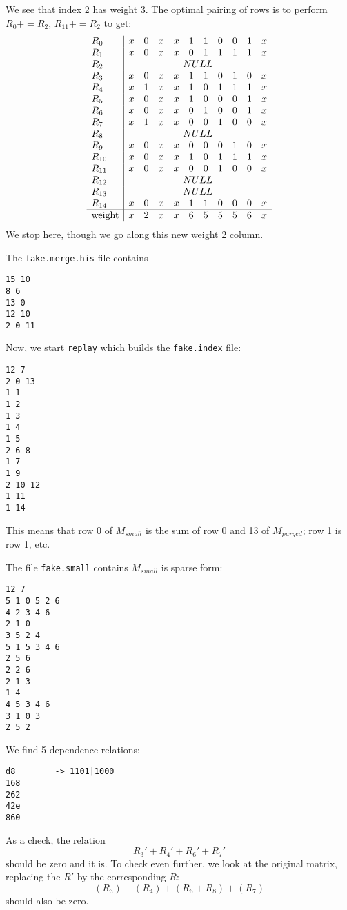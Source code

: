 \documentclass{article}
\begin{document}
We see that index 2 has weight 3. The optimal pairing of rows is to
perform $R_0 += R_2$, $R_{11} += R_2$ to get:
$$
\begin{array}{l|cccccccccc}
R_{0}& x& 0& x& x& 1& 1& 0& 0& 1& x\\
R_{1}& x& 0& x& x& 0& 1& 1& 1& 1& x\\
R_{2}& \multicolumn{10}{c}{NULL} \\
R_{3}& x& 0& x& x& 1& 1& 0& 1& 0& x\\
R_{4}& x& 1& x& x& 1& 0& 1& 1& 1& x\\
R_{5}& x& 0& x& x& 1& 0& 0& 0& 1& x\\
R_{6}& x& 0& x& x& 0& 1& 0& 0& 1& x\\
R_{7}& x& 1& x& x& 0& 0& 1& 0& 0& x\\
R_{8}& \multicolumn{10}{c}{NULL} \\
R_{9}& x& 0& x& x& 0& 0& 0& 1& 0& x\\
R_{10}& x& 0& x& x& 1& 0& 1& 1& 1& x\\
R_{11}& x& 0& x& x& 0& 0& 1& 0& 0& x\\
R_{12}& \multicolumn{10}{c}{NULL} \\
R_{13}& \multicolumn{10}{c}{NULL} \\
R_{14}& x& 0& x& x& 1& 1& 0& 0& 0& x\\
\hline
\text{weight}& x& 2& x& x& 6& 5& 5& 5& 6& x\\
\end{array}
$$
We stop here, though we go along this new weight 2 column.

The \verb+fake.merge.his+ file contains
\begin{verbatim}
15 10
8 6
13 0
12 10
2 0 11
\end{verbatim}

Now, we start \verb+replay+ which builds the \verb+fake.index+ file:
\begin{verbatim}
12 7
2 0 13
1 1
1 2
1 3
1 4
1 5
2 6 8
1 7
1 9
2 10 12
1 11
1 14
\end{verbatim}
This means that row 0 of $M_{small}$ is the sum of row 0 and 13 of
$M_{purged}$; row 1 is row 1, etc.

The file \verb+fake.small+ contains $M_{small}$ is sparse form:
\begin{verbatim}
12 7
5 1 0 5 2 6
4 2 3 4 6
2 1 0
3 5 2 4
5 1 5 3 4 6
2 5 6
2 2 6
2 1 3
1 4
4 5 3 4 6
3 1 0 3
2 5 2
\end{verbatim}
We find 5 dependence relations:
\begin{verbatim}
d8        -> 1101|1000
168
262
42e
860
\end{verbatim}
As a check, the relation
$$R_3'+R_4'+R_6'+R_7'$$
should be zero and it is. To check even further, we look at the
original matrix, replacing the $R'$ by the corresponding $R$:
$$(R_3)+(R_4)+(R_6+R_8)+(R_7)$$
should also be zero.
\end{document}
